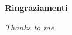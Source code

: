 \thispagestyle{empty}

\begin{center}
  {\bf \Huge Ringraziamenti}
\end{center}

\vspace{4cm}
\emph{Thanks to me}